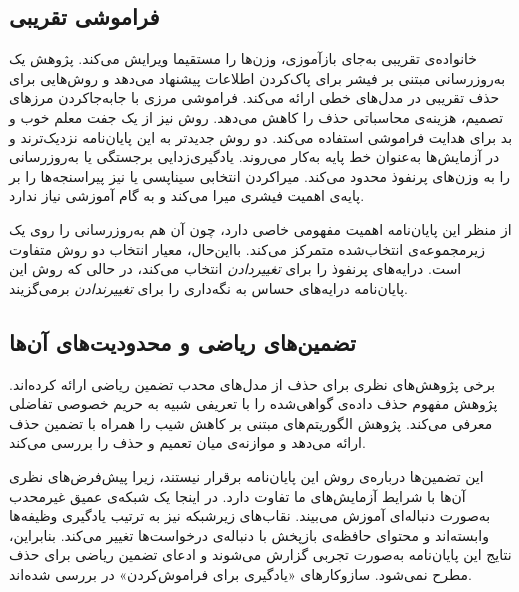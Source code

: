 \subsection{فراموشی تقریبی}
\label{subsec:lit-approx}

خانواده‌ی تقریبی به‌جای بازآموزی، وزن‌ها را مستقیما ویرایش می‌کند. پژوهش \cite{golatkar2020forgetting} یک به‌روزرسانی مبتنی بر فیشر برای پاک‌کردن اطلاعات پیشنهاد می‌دهد و \cite{izzo2021approximate} روش‌هایی برای حذف تقریبی در مدل‌های خطی ارائه می‌کند. {فراموشی مرزی} \cite{chen2023boundary} با جابه‌جاکردن مرزهای تصمیم، هزینه‌ی محاسباتی حذف را کاهش می‌دهد. روش \cite{chundawat2023bad} نیز از یک جفت معلم خوب و بد برای هدایت فراموشی استفاده می‌کند. دو روش جدیدتر به این پایان‌نامه نزدیک‌ترند و در آزمایش‌ها به‌عنوان خط پایه به‌کار می‌روند. {یادگیری‌زدایی برجستگی} یا  \cite{fan2024salun} به‌روزرسانی را به وزن‌های پرنفوذ محدود می‌کند. {میراکردن انتخابی سیناپسی} یا  \cite{foster2024ssd} نیز پیراسنجه‌ها را بر پایه‌ی اهمیت فیشری میرا می‌کند و به گام آموزشی نیاز ندارد.

 از منظر این پایان‌نامه اهمیت مفهومی خاصی دارد، چون آن هم به‌روزرسانی را روی یک زیرمجموعه‌ی انتخاب‌شده متمرکز می‌کند. بااین‌حال، معیار انتخاب دو روش متفاوت است.  درایه‌های پرنفوذ را برای \emph{تغییردادن} انتخاب می‌کند، در حالی که روش این پایان‌نامه درایه‌های حساس به نگه‌داری را برای \emph{تغییرندادن} برمی‌گزیند.

\subsection{تضمین‌های ریاضی و محدودیت‌های آن‌ها}
\label{subsec:lit-certified}

برخی پژوهش‌های نظری برای حذف از مدل‌های محدب تضمین ریاضی ارائه کرده‌اند. پژوهش \cite{guo2020certified} مفهوم {حذف داده‌ی گواهی‌شده} را با تعریفی شبیه به {حریم خصوصی تفاضلی} \cite{dwork2014algorithmic} معرفی می‌کند. پژوهش \cite{neel2021descent} الگوریتم‌های مبتنی بر کاهش شیب را همراه با تضمین حذف ارائه می‌دهد و \cite{sekhari2021remember} موازنه‌ی میان تعمیم و حذف را بررسی می‌کند.

این تضمین‌ها درباره‌ی روش این پایان‌نامه برقرار نیستند، زیرا پیش‌فرض‌های نظری آن‌ها با شرایط آزمایش‌های ما تفاوت دارد. در اینجا یک شبکه‌ی عمیق غیرمحدب به‌صورت دنباله‌ای آموزش می‌بیند. نقاب‌های زیرشبکه نیز به ترتیب یادگیری وظیفه‌ها وابسته‌اند و محتوای حافظه‌ی بازپخش با دنباله‌ی درخواست‌ها تغییر می‌کند. بنابراین، نتایج این پایان‌نامه به‌صورت تجربی گزارش می‌شوند و ادعای تضمین ریاضی برای حذف مطرح نمی‌شود. سازوکارهای «یادگیری برای فراموش‌کردن» در \cite{qu2023learntounlearn} بررسی شده‌اند.

